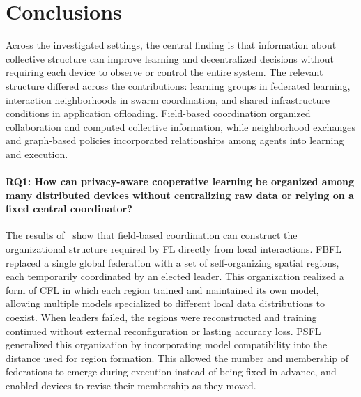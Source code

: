 \section{Conclusions}
\label{sec:conclusions}

Across the investigated settings, the central finding is that information about
 collective structure can improve learning and decentralized decisions
 without requiring each device to observe or control the entire system.
%
The relevant structure differed across the contributions:
 learning groups in federated learning, interaction neighborhoods in swarm coordination,
 and shared infrastructure conditions in application offloading.
%
Field-based coordination organized collaboration and computed collective information,
 while neighborhood exchanges and graph-based policies incorporated relationships
 among agents into learning and execution.
%

\paragraph{RQ1: How can privacy-aware cooperative learning be organized among
many distributed devices without centralizing raw data or relying on a fixed
central coordinator?}
%
The results of~ show that field-based coordination 
 can construct the organizational structure required by \gls{FL}
 directly from local interactions.
%
FBFL replaced a single global federation 
 with a set of self-organizing spatial regions, 
 each temporarily coordinated by an elected leader. 
% 
This organization realized a form of \gls{CFL} 
 in which each region trained and maintained its own model, 
 allowing multiple models specialized to different local data distributions to coexist. 
% 
When leaders failed, 
 the regions were reconstructed and training continued 
 without external reconfiguration or lasting accuracy loss.
%
PSFL generalized this organization by incorporating model compatibility 
 into the distance used for region formation. 
% 
This allowed the number and membership of federations 
 to emerge during execution instead of being fixed in advance, 
 and enabled devices to revise their membership as they moved.

